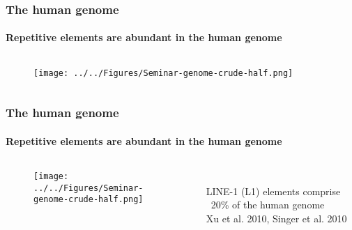 \documentclass{beamer}
\begin{document}
		\begin{frame} %
			
			\frametitle{The human genome}
			\framesubtitle{Repetitive elements are abundant in the human genome}
			\begin{columns}
				\begin{column}{0.5\linewidth}
				
			
					\begin{figure}
						\texttt{[image: ../../Figures/Seminar-genome-crude-half.png]}
					\end{figure}
						\end{column}
						\begin{column}{0.3\linewidth}
							
						\end{column}
					\end{columns}
		
		\end{frame}
		\begin{frame} %
			
			\frametitle{The human genome}
			\framesubtitle{Repetitive elements are abundant in the human genome}
			\begin{columns}
				\begin{column}{0.5\linewidth}
					
					
					\begin{figure}
						\texttt{[image: ../../Figures/Seminar-genome-crude-half.png]}
					\end{figure}
				\end{column}
				\begin{column}{0.3\linewidth}
					\vspace{2cm}
					\\
					LINE-1 (L1) elements comprise ~20\% of the human genome
					\vspace{1.2cm} 
					\\
					Xu et al. 2010, Singer et al. 2010
				\end{column}
			\end{columns}
						
		\end{frame}
\end{document}
